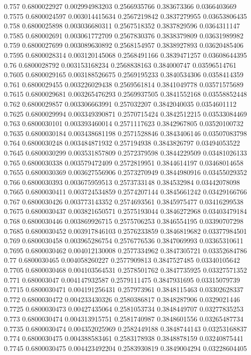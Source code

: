 {0.757 0.6800022927 0.002994983203 0.2566935766 0.383673366 0.0366403669
0.7575 0.6800024597 0.003014415634 0.2567219842 0.3837279955 0.03653806435
0.758 0.6800025898 0.003036680311 0.2567518352 0.3837829596 0.0364311147
0.7585 0.680002691 0.003061772709 0.2567830376 0.3838379809 0.03631989982
0.759 0.6800027699 0.003089630892 0.2568154957 0.3838927893 0.03620485406
0.7595 0.6800028314 0.003120145068 0.2568491166 0.3839471257 0.03608644395
0.76 0.6800028792 0.003153168234 0.2568838163 0.384000747 0.03596514761
0.7605 0.6800029165 0.003188526675 0.2569195233 0.3840534306 0.0358414359
0.761 0.6800029455 0.003226029438 0.2569561814 0.3841049778 0.03571575689
0.7615 0.6800029681 0.003265476293 0.2569937505 0.3841552168 0.03558852448
0.762 0.6800029857 0.003306663991 0.257032207 0.3842040035 0.0354601112
0.7625 0.6800029994 0.003349390871 0.2570715424 0.3842512215 0.03533084469
0.763 0.6800030101 0.003393460014 0.2571117623 0.3842967805 0.03520100732
0.7635 0.6800030184 0.003438681198 0.2571528846 0.3843406146 0.03507083798
0.764 0.6800030248 0.003484871932 0.257194938 0.3843826797 0.03494053522
0.7645 0.6800030299 0.003531857809 0.2572379598 0.3844229509 0.03481026133
0.765 0.6800030338 0.003579472409 0.2572819951 0.3844614197 0.03468014658
0.7655 0.6800030369 0.003627556906 0.2573270949 0.3844980916 0.03455029352
0.766 0.6800030393 0.003675959513 0.2573733148 0.384532984 0.03442078098
0.7665 0.6800030411 0.003724534859 0.2574207144 0.3845661242 0.03429166766
0.767 0.6800030426 0.003773143352 0.2574693561 0.3845975477 0.03416299538
0.7675 0.6800030437 0.003821650571 0.2575193044 0.3846272968 0.03403479184
0.768 0.6800030446 0.003869926715 0.2575706253 0.3846554195 0.03390707298
0.7685 0.6800030452 0.003917846103 0.2576233859 0.3846819682 0.03377984501
0.769 0.6800030458 0.003965286754 0.2576776536 0.3847069993 0.03365310611
0.7695 0.6800030462 0.004012130008 0.2577334962 0.3847305721 0.03352684786
0.77 0.6800030465 0.004058260227 0.2577909813 0.3847527485 0.03340105642
0.7705 0.6800030468 0.004103564531 0.2578501762 0.3847735925 0.03327571352
0.771 0.680003047 0.004147932587 0.2579111475 0.3847931695 0.03315079739
0.7715 0.6800030471 0.004191256431 0.257973961 0.3848115463 0.03302628337
0.772 0.6800030472 0.004233430326 0.2580386817 0.3848287906 0.0329021446
0.7725 0.6800030473 0.00427435064 0.2581053734 0.3848449707 0.03277835253
0.773 0.6800030474 0.004313915751 0.2581740987 0.3848601556 0.03265487734
0.7735 0.6800030474 0.004352025969 0.2582449188 0.3848744143 0.03253168837
0.774 0.6800030475 0.004388583461 0.2583178938 0.3848878159 0.03240875441
0.7745 0.6800030475 0.004423492204 0.2583930819 0.3849004294 0.03228604405
}
